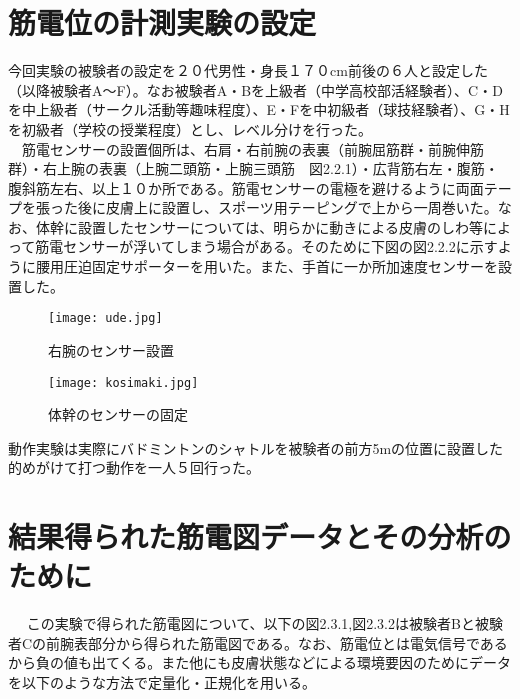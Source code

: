 \documentclass[11pt,a4j,notitlepage]{jreport}
\begin{document}
\section{筋電位の計測実験の設定}
今回実験の被験者の設定を２０代男性・身長１７０cm前後の６人と設定した（以降被験者A～F）。なお被験者A・Bを上級者（中学高校部活経験者）、C・Dを中上級者（サークル活動等趣味程度）、E・Fを中初級者（球技経験者）、G・Hを初級者（学校の授業程度）とし、レベル分けを行った。\\
　筋電センサーの設置個所は、右肩・右前腕の表裏（前腕屈筋群・前腕伸筋群）・右上腕の表裏（上腕二頭筋・上腕三頭筋　図2.2.1）・広背筋右左・腹筋・腹斜筋左右、以上１０か所である。筋電センサーの電極を避けるように両面テープを張った後に皮膚上に設置し、スポーツ用テーピングで上から一周巻いた。なお、体幹に設置したセンサーについては、明らかに動きによる皮膚のしわ等によって筋電センサーが浮いてしまう場合がある。そのために下図の図2.2.2に示すように腰用圧迫固定サポーターを用いた。また、手首に一か所加速度センサーを設置した。
\begin{figure}[htbp]
\begin{minipage}{0.5\hsize}
\begin{center}

\texttt{[image: ude.jpg]}
\caption{右腕のセンサー設置}
\end{center}
\end{minipage}
\begin{minipage}{0.5\hsize}
\begin{center}
\texttt{[image: kosimaki.jpg]}
\caption{体幹のセンサーの固定}

\end{center}
\end{minipage}
\end{figure}


動作実験は実際にバドミントンのシャトルを被験者の前方5mの位置に設置した的めがけて打つ動作を一人５回行った。

\section{結果得られた筋電図データとその分析のために}　
この実験で得られた筋電図について、以下の図2.3.1,図2.3.2は被験者Bと被験者Cの前腕表部分から得られた筋電図である。なお、筋電位とは電気信号であるから負の値も出てくる。また他にも皮膚状態などによる環境要因のためにデータを以下のような方法で定量化・正規化を用いる。
\end{document}
